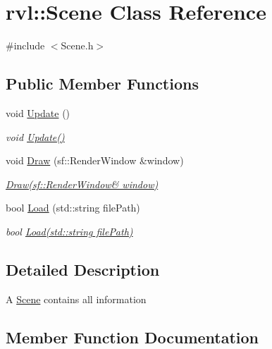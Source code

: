\hypertarget{classrvl_1_1_scene}{}\section{rvl\+:\+:Scene Class Reference}
\label{classrvl_1_1_scene}


{\ttfamily \#include $<$Scene.\+h$>$}

\subsection*{Public Member Functions}
\begin{DoxyCompactItemize}
\item 
void \hyperlink{classrvl_1_1_scene_ae6675125abb9ee6dc2e1be81aef3e270}{Update} ()
\begin{DoxyCompactList}\small\item\em void \hyperlink{classrvl_1_1_scene_ae6675125abb9ee6dc2e1be81aef3e270}{Update()} \end{DoxyCompactList}\item 
void \hyperlink{classrvl_1_1_scene_a62dd092ce10da061bb2bbb49eb0607db}{Draw} (sf\+::\+Render\+Window \&window)
\begin{DoxyCompactList}\small\item\em \hyperlink{classrvl_1_1_scene_a62dd092ce10da061bb2bbb49eb0607db}{Draw(sf\+::\+Render\+Window\& window)} \end{DoxyCompactList}\item 
bool \hyperlink{classrvl_1_1_scene_ab871b7005408e83aaf2df91051338c5f}{Load} (std\+::string file\+Path)
\begin{DoxyCompactList}\small\item\em bool \hyperlink{classrvl_1_1_scene_ab871b7005408e83aaf2df91051338c5f}{Load(std\+::string file\+Path)} \end{DoxyCompactList}\end{DoxyCompactItemize}


\subsection{Detailed Description}
A \hyperlink{classrvl_1_1_scene}{Scene} contains all information 

\subsection{Member Function Documentation}
\mbox{\label{classrvl_1_1_scene_a62dd092ce10da061bb2bbb49eb0607db}} 
